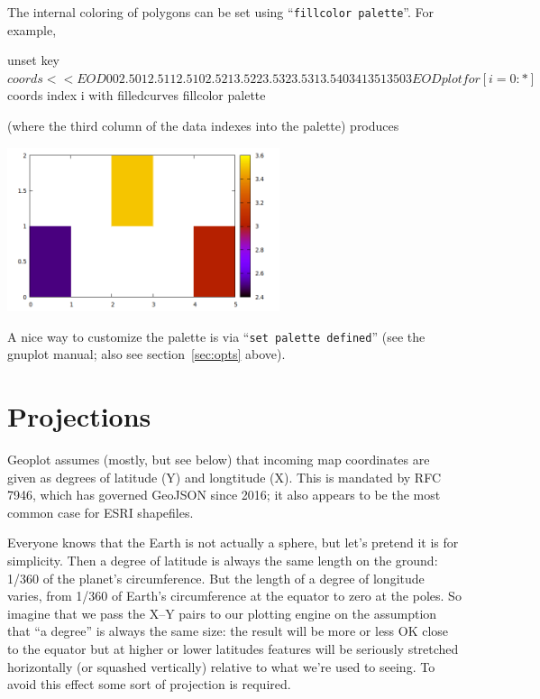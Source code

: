 \documentclass{article}
\newcommand{\myappendix}[1]{%
\addtocounter{appcount}{1}
\section{#1}}
\begin{document}
\medskip

The internal coloring of polygons can be set using ``\texttt{fillcolor
  palette}''. For example,
\begin{code}
unset key
$coords << EOD
0 0 2.5
0 1 2.5
1 1 2.5
1 0 2.5

2 1 3.5
2 2 3.5
3 2 3.5
3 1 3.5

4 0 3
4 1 3
5 1 3
5 0 3
EOD
plot for [i=0:*] $coords index i with filledcurves fillcolor palette
\end{code}
(where the third column of the data indexes into the palette) produces
\begin{center}
  \includegraphics[width=0.6\textwidth]{squares}
\end{center}

A nice way to customize the palette is via ``\texttt{set
  palette defined}'' (see the \textsf{gnuplot} manual; also see
section~\ref{sec:opts} above).

\clearpage
\myappendix{Projections}
\label{app:proj}

\textsf{Geoplot} assumes (mostly, but see below) that incoming map
coordinates are given as degrees of latitude (Y) and longtitude
(X). This is mandated by RFC 7946, which has governed GeoJSON since
2016; it also appears to be the most common case for ESRI shapefiles.

Everyone knows that the Earth is not actually a sphere, but let's
pretend it is for simplicity. Then a degree of latitude is always the
same length on the ground: 1/360 of the planet's circumference. But
the length of a degree of longitude varies, from 1/360 of Earth's
circumference at the equator to zero at the poles. So imagine that we
pass the X--Y pairs to our plotting engine on the assumption that ``a
degree'' is always the same size: the result will be more or less OK
close to the equator but at higher or lower latitudes features will be
seriously stretched horizontally (or squashed vertically) relative to
what we're used to seeing. To avoid this effect some sort of
projection is required.
\end{document}
